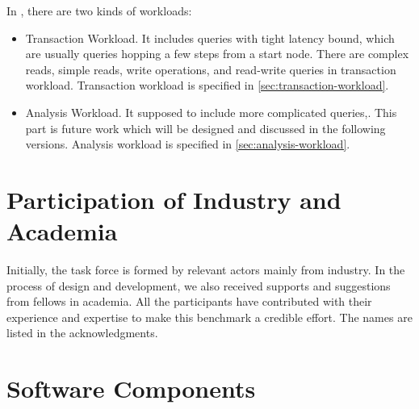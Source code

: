 In \ldbcfinbench, there are two kinds of workloads:
\begin{itemize}
    \item Transaction Workload. It includes queries with tight latency bound, which are usually
    queries hopping a few steps from a start node. There are complex reads, simple reads, write
    operations, and read-write queries in transaction workload. Transaction workload is specified
    in \autoref{sec:transaction-workload}.
    \item Analysis Workload. It supposed to include more complicated queries,. This part is future work which will be designed and discussed in the
    following versions. Analysis workload is specified in \autoref{sec:analysis-workload}.
\end{itemize}


\section{Participation of Industry and Academia}

Initially, the \ldbcfinbench task force is formed by relevant actors mainly from
industry. In the process of design and development, we also received supports and
suggestions from fellows in academia. All the participants have contributed with
their experience and expertise to make this benchmark a credible effort. The names
are listed in the acknowledgments.


\section{Software Components}

